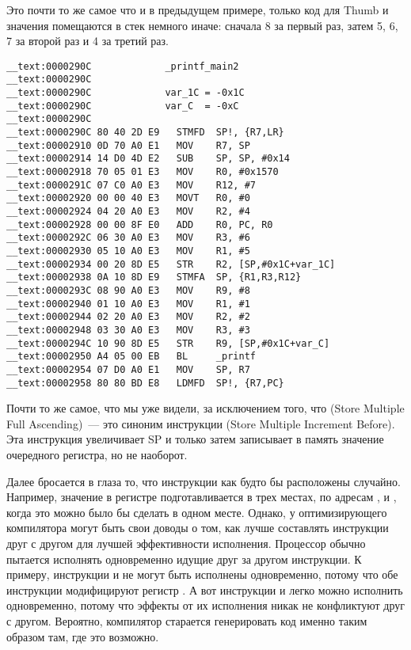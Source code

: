 Это почти то же самое что и в предыдущем примере, только код для Thumb и значения помещаются в 
стек немного иначе: сначала 8 за первый раз, затем 5, 6, 7 за второй раз и 4 за третий раз.

\myparagraph{\OptimizingXcodeIV: \ARMMode}

\begin{lstlisting}
__text:0000290C             _printf_main2
__text:0000290C
__text:0000290C             var_1C = -0x1C
__text:0000290C             var_C  = -0xC
__text:0000290C
__text:0000290C 80 40 2D E9   STMFD  SP!, {R7,LR}
__text:00002910 0D 70 A0 E1   MOV    R7, SP
__text:00002914 14 D0 4D E2   SUB    SP, SP, #0x14
__text:00002918 70 05 01 E3   MOV    R0, #0x1570
__text:0000291C 07 C0 A0 E3   MOV    R12, #7
__text:00002920 00 00 40 E3   MOVT   R0, #0
__text:00002924 04 20 A0 E3   MOV    R2, #4
__text:00002928 00 00 8F E0   ADD    R0, PC, R0
__text:0000292C 06 30 A0 E3   MOV    R3, #6
__text:00002930 05 10 A0 E3   MOV    R1, #5
__text:00002934 00 20 8D E5   STR    R2, [SP,#0x1C+var_1C]
__text:00002938 0A 10 8D E9   STMFA  SP, {R1,R3,R12}
__text:0000293C 08 90 A0 E3   MOV    R9, #8
__text:00002940 01 10 A0 E3   MOV    R1, #1
__text:00002944 02 20 A0 E3   MOV    R2, #2
__text:00002948 03 30 A0 E3   MOV    R3, #3
__text:0000294C 10 90 8D E5   STR    R9, [SP,#0x1C+var_C]
__text:00002950 A4 05 00 EB   BL     _printf
__text:00002954 07 D0 A0 E1   MOV    SP, R7
__text:00002958 80 80 BD E8   LDMFD  SP!, {R7,PC}
\end{lstlisting}

Почти то же самое, что мы уже видели, за исключением того, что  (Store Multiple Full Ascending)~--- 
это синоним инструкции  (Store Multiple Increment Before). 
Эта инструкция увеличивает \ac{SP} и только затем записывает в память значение очередного регистра, но не наоборот.

Далее бросается в глаза то, что инструкции как будто бы расположены случайно.
Например, значение в регистре  подготавливается в трех местах, по адресам ,  и , 
когда это можно было бы сделать в одном месте.
Однако, у оптимизирующего компилятора могут быть свои доводы о том, как лучше составлять инструкции 
друг с другом для лучшей эффективности исполнения.
Процессор обычно пытается исполнять одновременно идущие друг за другом инструкции.
К примеру, инструкции  и  не могут быть исполнены одновременно,
потому что обе инструкции модифицируют регистр . 
А вот инструкции  и  легко можно исполнить одновременно, 
потому что эффекты от их исполнения никак не конфликтуют друг с другом.
Вероятно, компилятор старается генерировать код именно таким образом там, где это возможно.
 
